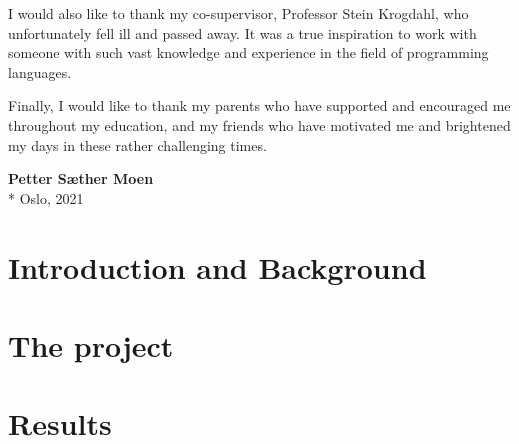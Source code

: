 \documentclass[UKenglish]{ifimaster}
\begin{document}
I would also like to thank my co-supervisor, Professor Stein Krogdahl, who unfortunately fell ill and passed away.
It was a true inspiration to work with someone with such vast knowledge and experience in the field of programming languages.

Finally, I would like to thank my parents who have supported and encouraged me throughout my education, and my friends who have motivated me and brightened my days in these rather challenging times.\\

\begin{flushright}
    \textbf{Petter Sæther Moen}\\*
    Oslo, 2021
\end{flushright}

\hypersetup{linkcolor=black}

\tableofcontents{}
\listoflistings{}



\cleardoublepage

\hypersetup{linkcolor=blue}

\mainmatter{}


\part{Introduction and Background}\label{part:introduction}





\part{The project}\label{part:the-project}









\part{Results}\label{part:Results}






\backmatter{}
\printbibliography
\end{document}

